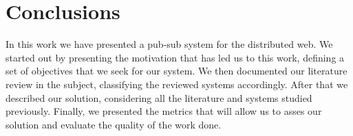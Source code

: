 
%
%

\section{Conclusions}

In this work we have presented a pub-sub system for the distributed web.
We started out by presenting the motivation that has led us to this work,
defining a set of objectives that we seek for our system. We then documented our
literature review in the subject, classifying the reviewed systems accordingly.
After that we described our solution, considering all the literature and systems
studied previously. Finally, we presented the metrics that will allow us to
asses our solution and evaluate the quality of the work done.
